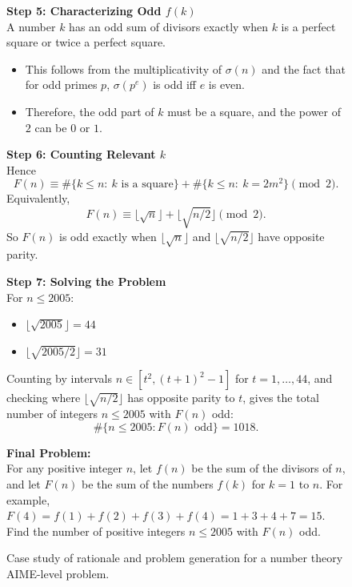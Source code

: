 \begin{figure}[ht]
{\begin{minipage}{0.99\textwidth}
              \vspace{0.5em}
              \noindent\textbf{Step 5: Characterizing Odd $f(k)$} \\
              A number $k$ has an odd sum of divisors exactly when $k$ is a perfect square or twice a perfect square.  
              \begin{itemize}
                  \item This follows from the multiplicativity of $\sigma(n)$ and the fact that for odd primes $p$, $\sigma(p^e)$ is odd iff $e$ is even.  
                  \item Therefore, the odd part of $k$ must be a square, and the power of $2$ can be $0$ or $1$.  
              \end{itemize}
  
              \vspace{0.5em}
              \noindent\textbf{Step 6: Counting Relevant $k$} \\
              Hence
              \[
              F(n) \equiv \#\{k\leq n:\ k\text{ is a square}\}+\#\{k\leq n:\ k=2m^2\}\pmod 2.
              \]
              Equivalently,
              \[
              F(n)\equiv \lfloor \sqrt{n}\rfloor + \lfloor \sqrt{n/2}\rfloor \pmod 2.
              \]
              So $F(n)$ is odd exactly when $\lfloor \sqrt{n}\rfloor$ and $\lfloor \sqrt{n/2}\rfloor$ have opposite parity.
  
              \vspace{0.5em}
              \noindent\textbf{Step 7: Solving the Problem} \\
              For $n\leq 2005$:  
              \begin{itemize}
                  \item $\lfloor \sqrt{2005}\rfloor = 44$  
                  \item $\lfloor \sqrt{2005/2}\rfloor = 31$
              \end{itemize}
              Counting by intervals $n\in[t^2,(t+1)^2-1]$ for $t=1,\dots,44$, and checking where $\lfloor \sqrt{n/2}\rfloor$ has opposite parity to $t$, gives the total number of integers $n\leq 2005$ with $F(n)$ odd:
              \[
              \#\{n\leq 2005 : F(n)\text{ odd}\} = 1018.
              \]
  
              \vspace{1em}
              \textbf{Final Problem:} \\
              For any positive integer $n$, let $f(n)$ be the sum of the divisors of $n$, and let $F(n)$ be the sum of the numbers $f(k)$ for $k = 1$ to $n$. For example, $F(4) = f(1) + f(2) + f(3) + f(4) = 1 + 3 + 4 + 7 = 15$. Find the number of positive integers $n \leq 2005$ with $F(n)$ odd.
          \end{minipage}%
      }
      \caption{Case study of rationale and problem generation for a number theory AIME-level problem.}
      \label{fig:case_study_rationale1}
  \end{figure}
  
